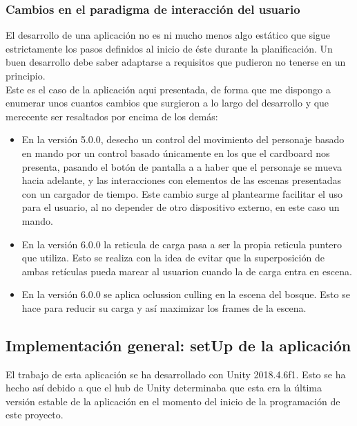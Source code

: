 \subsubsection{Cambios en el paradigma de interacción del usuario}

\quad El desarrollo de una aplicación no es ni mucho menos algo estático que sigue estrictamente los pasos definidos al inicio de éste durante la planificación. Un buen desarrollo debe saber adaptarse a requisitos que pudieron no tenerse en un principio.\\

\quad Este es el caso de la aplicación aqui presentada, de forma que me dispongo a enumerar unos cuantos cambios que surgieron a lo largo del desarrollo y que merecente ser resaltados por encima de los demás:\\

\begin{itemize}
	\item En la versión 5.0.0, desecho un control del movimiento del personaje basado en mando por un control basado únicamente en los que el cardboard nos presenta, pasando el botón de pantalla a a haber que el personaje se mueva hacia adelante, y las interacciones con elementos de las escenas presentadas con un cargador de tiempo. Este cambio surge al plantearme facilitar el uso para el usuario, al no depender de otro dispositivo externo, en este caso un mando.
	\item En la versión 6.0.0 la reticula de carga pasa a ser la propia reticula puntero que utiliza. Esto se realiza con la idea de evitar que la superposición de ambas retículas pueda marear al usuarion cuando la de carga entra en escena.
	\item  En la versión 6.0.0 se aplica oclussion culling en la escena del bosque. Esto se hace para reducir su carga y así maximizar los frames de la escena.
\end{itemize}

\subsection{Implementación general: setUp de la aplicación}

\quad El trabajo de esta aplicación se ha desarrollado con Unity 2018.4.6f1. Esto se ha hecho así debido a que el hub de Unity determinaba que esta era la última versión estable de la aplicación en el momento del inicio de la programación de este proyecto.\\

